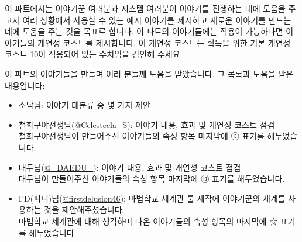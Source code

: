 \documentclass{report}
\begin{document}
	이 파트에서는 이야기꾼 여러분과 시스템 여러분이 이야기를 진행하는 데에 도움을 주고자 여러 상황에서 사용할 수 있는 예시 이야기를 제시하고 새로운 이야기를 만드는 데에 도움을 주는 것을 목표로 합니다. 이 파트의 이야기들에는 적용이 가능하다면 이야기들의 개연성 코스트를 제시합니다. 이 개연성 코스트는 획득을 위한 기본 개연성 코스트 10이 적용되어 있는 수치임을 감안해 주세요.
	
	이 파트의 이야기들을 만들며 여러 분들께 도움을 받았습니다. 그 목록과 도움을 받은 내용입니다:
	\begin{itemize}
		\item 소낙님: 이야기 대분류 중 몇 가지 제안
		
		\item 철화구야선생님(\href{https://twitter.com/Celesteela_S}{@Celesteela\_S}): 이야기 내용, 효과 및 개연성 코스트 점검\\
		철화구야선생님이 만들어주신 이야기들의 속성 항목 마지막에 ⓣ 표기를 해두었습니다.
		
		\item 대두님(\href{https://twitter.com/_DAEDU_}{@\_DAEDU\_}): 이야기 내용, 효과 및 개연성 코스트 점검\\
		대두님이 만들어주신 이야기들의 속성 항목 마지막에 Ⓓ  표기를 해두었습니다.
		
		\item FD(퍼디)님(\href{https://twitter.com/firstdelusion46}{@firstdelusion46}): 마법학교 세계관 룰 제작에 이야기꾼의 세계를 사용하는 것을 제안해주셨습니다.\\
		마법학교 세계관에 대해 생각하며 나온 이야기들의 속성 항목의 마지막에 ☆ 표기를 해두었습니다.
	\end{itemize}
\end{document}
